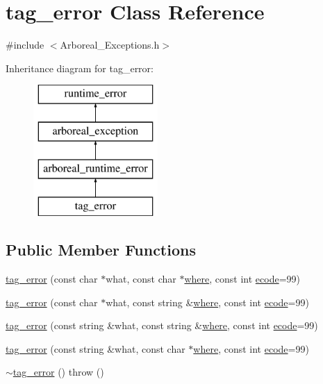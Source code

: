 \hypertarget{classtag__error}{}\section{tag\+\_\+error Class Reference}
\label{classtag__error}


{\ttfamily \#include $<$Arboreal\+\_\+\+Exceptions.\+h$>$}

Inheritance diagram for tag\+\_\+error\+:\begin{figure}[H]
\begin{center}
\leavevmode
\includegraphics[height=5.000000cm]{classtag__error}
\end{center}
\end{figure}
\subsection*{Public Member Functions}
\begin{DoxyCompactItemize}
\item 
\mbox{\hyperlink{classtag__error_a49b7eb59916bbc065f7d79bbf31cb460}{tag\+\_\+error}} (const char $\ast$what, const char $\ast$\mbox{\hyperlink{classarboreal__exception_a802003dee586aaeb0b0d7ce909da2dad}{where}}, const int \mbox{\hyperlink{classarboreal__exception_a318e716601c544d92ff9af25edebd725}{ecode}}=99)
\item 
\mbox{\hyperlink{classtag__error_abc7794a3cf421776f77b781b4bef9dfb}{tag\+\_\+error}} (const char $\ast$what, const string \&\mbox{\hyperlink{classarboreal__exception_a802003dee586aaeb0b0d7ce909da2dad}{where}}, const int \mbox{\hyperlink{classarboreal__exception_a318e716601c544d92ff9af25edebd725}{ecode}}=99)
\item 
\mbox{\hyperlink{classtag__error_afc103fa30ef508088c2cb4eda60837d2}{tag\+\_\+error}} (const string \&what, const string \&\mbox{\hyperlink{classarboreal__exception_a802003dee586aaeb0b0d7ce909da2dad}{where}}, const int \mbox{\hyperlink{classarboreal__exception_a318e716601c544d92ff9af25edebd725}{ecode}}=99)
\item 
\mbox{\hyperlink{classtag__error_a70a4e7f9da04ca034f23e42ce1e95433}{tag\+\_\+error}} (const string \&what, const char $\ast$\mbox{\hyperlink{classarboreal__exception_a802003dee586aaeb0b0d7ce909da2dad}{where}}, const int \mbox{\hyperlink{classarboreal__exception_a318e716601c544d92ff9af25edebd725}{ecode}}=99)
\item 
\mbox{\hyperlink{classtag__error_a197c2032279f3288647bb87e42f2ae50}{$\sim$tag\+\_\+error}} ()  throw ()
\end{DoxyCompactItemize}
